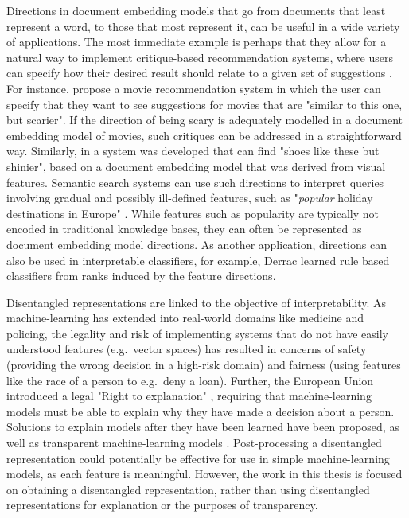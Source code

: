 Directions in document embedding models that go from documents that least represent a word, to those that most represent it, can be useful in a wide variety of applications. The most immediate example is perhaps that they allow for a natural way to implement critique-based recommendation systems, where users can specify how their desired result should relate to a given set of suggestions \cite{Viappiani2006}. For instance, \cite{Vig2014} propose a movie recommendation system in which the user can specify that they want to see suggestions for movies that are "similar to this one, but scarier". If the direction of being scary is adequately modelled in a document embedding model of movies, such critiques can be addressed in a straightforward way. Similarly, in \cite{Kovashka} a system was developed that can find "shoes like these but shinier", based on a document embedding model that was derived from visual features. Semantic search systems can use such directions to interpret queries involving gradual and possibly ill-defined features, such as "\emph{popular} holiday destinations in Europe" \cite{Jameel}. While features such as popularity are typically not encoded in traditional knowledge bases, they can often be represented as document embedding model directions.  As another application, directions can also be used in interpretable classifiers, for example, Derrac \cite{Derrac2015} learned rule based classifiers from ranks induced by the feature directions.

Disentangled representations  are linked to the objective of interpretability. As machine-learning has extended into  real-world domains like medicine and policing,  the legality and risk of implementing systems that do not have easily understood features (e.g.\ vector spaces) has resulted in concerns of safety \cite{Amodei2016} (providing the wrong decision in a high-risk domain) and fairness \cite{Mehrabi2019} (using features like  the race of a person to e.g.\ deny a loan). Further, the European Union introduced a legal "Right to explanation" \cite{Goodman2016}, requiring that machine-learning models must be able to explain why they have made a decision about a person. Solutions to explain models after they have been learned have been proposed, as well as transparent machine-learning models  \cite{Gilpina}.  Post-processing a disentangled representation could potentially be effective for use in simple machine-learning models, as each feature is meaningful. However, the work in this thesis is focused on obtaining a disentangled representation, rather than using disentangled representations for explanation or the purposes of transparency.

